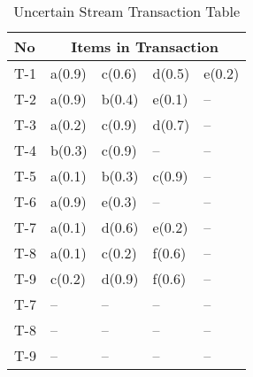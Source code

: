 %
%
\begin{table}[ht]
\centering

\begin{tabular}{|l|l|l|l|l|}
\hline
No & \multicolumn{4}{c|}{Items in Transaction} \\ \hline \hline
	T-1 & a(0.9) & c(0.6) & d(0.5) & e(0.2)\\\hline
	T-2 & a(0.9) & b(0.4) & e(0.1) & --    \\\hline
	T-3 & a(0.2) & c(0.9) & d(0.7) & --    \\\hline
	T-4 & b(0.3) & c(0.9) & -- & --\\\hline
	T-5 & a(0.1) & b(0.3) & c(0.9) & --    \\\hline
	T-6 & a(0.9) & e(0.3) & -- & --        \\\hline
   	T-7 & a(0.1) & d(0.6) & e(0.2) & --    \\\hline
	T-8 & a(0.1) & c(0.2) & f(0.6) & --    \\\hline
	T-9 & c(0.2) & d(0.9) & f(0.6) & --    \\\hline

	T-7 &  --  &  --  &  --  & --    \\\hline
	T-8 &  --  &  --  &  --  & --    \\\hline
	T-9 &  --  &  --  &  --  & --    \\\hline
\end{tabular}
\label{tab:ex_u}
\caption{Uncertain Stream Transaction Table}

\end{table}
%